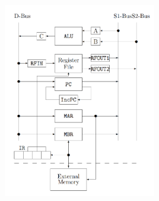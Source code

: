 \documentclass{article}
\begin{document}
\includegraphics[width=0.5\textwidth]{../ex-CPU.png}
\end{document}

